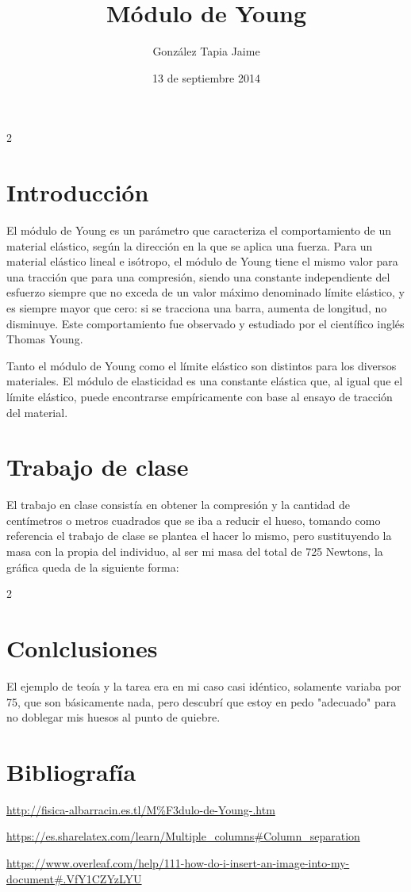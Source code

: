 \documentclass[11pt,a4paper]{article}
\begin{document}
\begin{multicols}{2}
\author{Gonz\'alez Tapia Jaime}
\title{M\'odulo de Young}
\date {13 de septiembre 2014}
\maketitle

\section{Introducci\'on}
El m\'odulo de Young  es un par\'ametro que caracteriza el comportamiento de un material el\'astico, seg\'un la direcci\'on en la que se aplica una fuerza. Para un material el\'astico lineal e is\'otropo, el m\'odulo de Young tiene el mismo valor para una tracci\'on que para una compresi\'on, siendo una constante  independiente del esfuerzo siempre que no exceda de un valor m\'aximo denominado l\'imite el\'astico, y es siempre mayor que cero: si se tracciona una barra, aumenta de longitud, no disminuye. Este comportamiento fue observado y estudiado por el científico ingl\'es Thomas Young.


Tanto el m\'odulo de Young como el l\'imite el\'astico son distintos para los diversos materiales. El m\'odulo de elasticidad es una constante el\'astica que, al igual que el l\'imite el\'astico, puede encontrarse emp\'iricamente con base al ensayo de tracci\'on del material.


\section{Trabajo de clase}
El trabajo en clase consist\'ia en obtener la compresi\'on y la cantidad de cent\'imetros o metros cuadrados que se iba a reducir el hueso, tomando como referencia el trabajo de clase se plantea el hacer lo mismo, pero sustituyendo la masa con la propia del individuo, al ser mi masa del total de 725 Newtons, la gr\'afica queda de la siguiente forma:
\end{multicols}

\begin{multicols} {2}


\section{Conlclusiones}
El ejemplo de teo\'ia y la tarea era en mi caso casi id\'entico, solamente variaba por 75, que son b\'asicamente nada, pero descubr\'i que estoy en pedo "adecuado" para no doblegar mis huesos al punto de quiebre.
\end{multicols}
 
\section{Bibliograf\'ia}
\url{http://fisica-albarracin.es.tl/M%F3dulo-de-Young-.htm}

\url{https://es.sharelatex.com/learn/Multiple_columns#Column_separation}

\url{https://www.overleaf.com/help/111-how-do-i-insert-an-image-into-my-document#.VfY1CZYzLYU}
\end{document}
